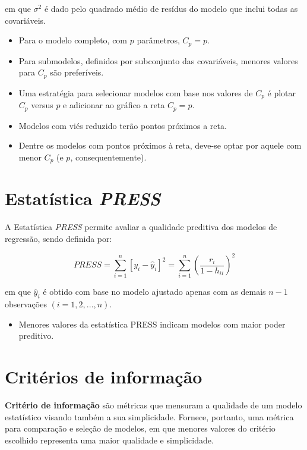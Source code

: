 \noindent em que $\sigma^2$ é dado pelo quadrado médio de resídus do modelo que inclui todas as covariáveis.

\begin{itemize}
\item Para o modelo completo, com $p$ parâmetros, $C_p = p$.
\item Para submodelos, definidos por subconjunto das covariáveis, menores
valores para $C_p$ são preferíveis.
\item Uma estratégia para selecionar modelos com base nos valores de $C_p$ é
plotar $C_p$ versus $p$ e adicionar ao gráfico a reta $C_p = p$.
\item Modelos com viés reduzido terão pontos próximos a reta.
\item Dentre os modelos com pontos próximos à reta, deve-se optar por
aquele com menor $C_p$ (e $p$, consequentemente).

\end{itemize}

\section{Estatística \textit{PRESS}}

\noindent A Estatística \textit{PRESS} \cite{allen1971prediction} permite  avaliar a qualidade preditiva dos modelos de regressão, sendo definida por:

$$PRESS=\sum_{i=1}^{n}[y_i-\widehat{y}_i]^2=\sum_{i=1}^{n}\left ( \frac{r_i}{1-h_{ii}} \right )^2$$

em que $\widehat{y}_i$ é obtido com base no modelo ajustado apenas com as demais
$n-1$ observações $(i = 1, 2, ..., n)$.

\begin{itemize}
\item Menores valores da estatística PRESS indicam modelos com maior poder preditivo.
\end{itemize}

\section{Critérios de informação}

\noindent \textbf{Critério de informação} são métricas que mensuram a qualidade de um modelo estatístico visando também a sua simplicidade. Fornece, portanto, uma métrica para comparação e seleção de modelos, em que menores valores do critério escolhido representa uma maior qualidade e simplicidade.

